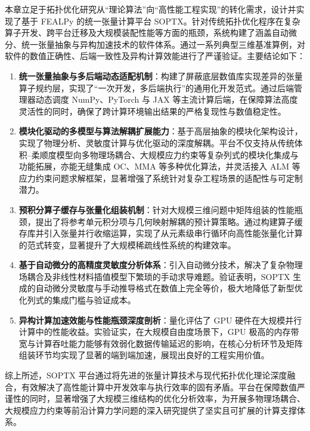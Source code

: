 本章立足于拓扑优化研究从“理论算法”向“高性能工程实现”的转化需求，设计并实现了基于 FEALPy 的统一张量计算平台 SOPTX。针对传统拓扑优化程序在复杂算子开发、跨平台迁移及大规模装配性能等方面的瓶颈，系统构建了涵盖自动微分、统一张量抽象与异构加速技术的软件体系。通过一系列典型三维基准算例，对软件的数值正确性、后端一致性及异构计算效能进行了严谨验证。主要结论如下：

\begin{enumerate}
	\item \textbf{统一张量抽象与多后端动态适配机制}：构建了屏蔽底层数值库实现差异的张量算子规约层，实现了“一次开发，多后端执行”的通用化开发范式。通过后端管理器动态调度 NumPy、PyTorch 与 JAX 等主流计算后端，在保障算法高度灵活性的同时，确保了跨计算环境输出结果的严格复现性与数值稳定性。
	
	\item \textbf{模块化驱动的多模型与算法解耦扩展能力}：基于高层抽象的模块化架构设计，实现了物理分析、灵敏度计算与优化驱动的深度解耦。平台不仅支持从传统体积--柔顺度模型向多物理场耦合、大规模应力约束等复杂列式的模块化集成与功能拓展，亦能无缝集成 OC、MMA 等多种优化算法，并灵活接入 ALM 等应力约束问题求解框架，显著增强了系统针对复杂工程场景的适配性与可定制潜力。
	
	\item \textbf{预积分算子缓存与张量化组装机制}：针对大规模三维问题中矩阵组装的性能瓶颈，提出了将参考单元积分项与几何映射解耦的预计算策略。通过构建算子缓存库并引入张量并行收缩运算，实现了从元素级串行循环向高性能张量化计算的范式转变，显著提升了大规模稀疏线性系统的构建效率。
	
	\item \textbf{基于自动微分的高精度灵敏度分析体系}：引入自动微分技术，解决了复杂物理场耦合及非线性材料插值模型下繁琐的手动求导难题。验证表明，SOPTX 生成的自动微分灵敏度与手动推导格式在数值上完全等价，极大地降低了新型优化列式的集成门槛与验证成本。
	
	\item \textbf{异构计算加速效能与性能瓶颈深度剖析}：量化评估了 GPU 硬件在大规模并行计算中的性能收益。实验证实，在大规模自由度场景下，GPU 极高的内存带宽与计算吞吐能力能够有效弱化数据传输延迟的影响，在核心分析环节及矩阵组装环节均实现了显著的端到端加速，展现出良好的工程实用价值。
\end{enumerate}

综上所述，SOPTX 平台通过将先进的张量计算技术与现代拓扑优化理论深度融合，有效解决了高性能计算中开发效率与执行效率的固有矛盾。平台在保障数值严谨性的同时，显著增强了大规模三维结构的优化分析效率，为开展多物理场耦合、大规模应力约束等前沿计算力学问题的深入研究提供了坚实且可扩展的计算支撑体系。


